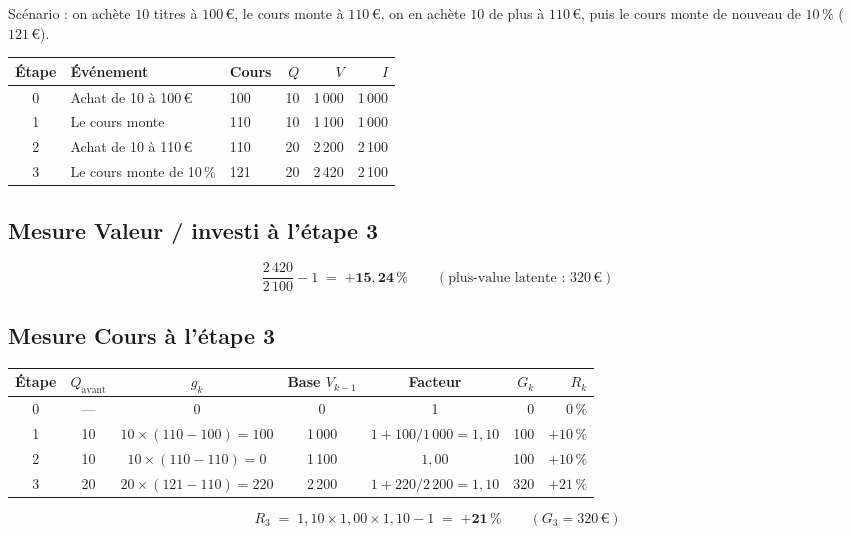 \documentclass[11pt,a4paper]{article}
\newcommand{\avant}{\mathrm{avant}}
\begin{document}
Scénario : on achète $10$ titres à $100\,€$, le cours monte à $110\,€$, on en achète $10$ de plus à $110\,€$, puis le
cours monte de nouveau de $10\,\%$ ($121\,€$).

\begin{center}
\small
\begin{tabular}{@{}cllrrr@{}}
\toprule
\textbf{Étape} & \textbf{Événement} & \textbf{Cours} & $Q$ & $V$ & $I$\\
\midrule
0 & Achat de 10 à 100\,€ & 100 & 10 & 1\,000 & 1\,000\\
1 & Le cours monte & 110 & 10 & 1\,100 & 1\,000\\
2 & Achat de 10 à 110\,€ & 110 & 20 & 2\,200 & 2\,100\\
3 & Le cours monte de 10\,\% & 121 & 20 & 2\,420 & 2\,100\\
\bottomrule
\end{tabular}
\end{center}

\subsection*{Mesure \og Valeur / investi \fg{} à l'étape 3}
\begin{formules}
\[
\frac{2\,420}{2\,100}-1 \;=\; \mathbf{+15{,}24\,\%}\qquad(\text{plus-value latente : }320\,€)
\]
\end{formules}

\subsection*{Mesure \og Cours \fg{} à l'étape 3}
\begin{center}
\small
\begin{tabular}{@{}cccccrr@{}}
\toprule
\textbf{Étape} & $Q_{\avant}$ & $g_k$ & Base $V_{k-1}$ & Facteur & $G_k$ & $R_k$\\
\midrule
0 & --- & 0 & 0 & 1 & 0 & $0\,\%$\\
1 & 10 & $10\times(110-100)=100$ & 1\,000 & $1+100/1\,000=1{,}10$ & 100 & $+10\,\%$\\
2 & 10 & $10\times(110-110)=0$ & 1\,100 & $1{,}00$ & 100 & $+10\,\%$\\
3 & 20 & $20\times(121-110)=220$ & 2\,200 & $1+220/2\,200=1{,}10$ & 320 & $+21\,\%$\\
\bottomrule
\end{tabular}
\end{center}

\begin{formules}
\[
R_3 \;=\; 1{,}10\times 1{,}00\times 1{,}10-1 \;=\; \mathbf{+21\,\%}\qquad(G_3=320\,€)
\]
\end{formules}
\end{document}
